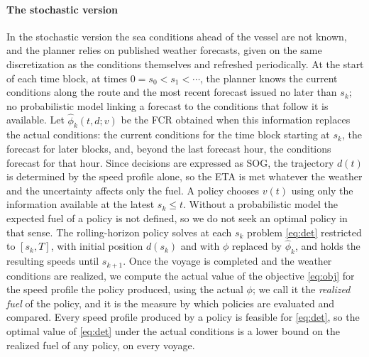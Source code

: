 \documentclass[review,authoryear]{elsarticle}
\begin{document}
\paragraph{The stochastic version}
In the stochastic version the sea conditions ahead of the vessel are not known, and the planner relies on published weather forecasts, given on the same discretization as the conditions themselves and refreshed periodically. At the start of each time block, at times $0=s_0<s_1<\cdots$, the planner knows the current conditions along the route and the most recent forecast issued no later than $s_k$; no probabilistic model linking a forecast to the conditions that follow it is available. Let $\hat\phi_k(t,d;v)$ be the FCR obtained when this information replaces the actual conditions: the current conditions for the time block starting at $s_k$, the forecast for later blocks, and, beyond the last forecast hour, the conditions forecast for that hour. Since decisions are expressed as SOG, the trajectory $d(t)$ is determined by the speed profile alone, so the ETA is met whatever the weather and the uncertainty affects only the fuel. A policy chooses $v(t)$ using only the information available at the latest $s_k\le t$. Without a probabilistic model the expected fuel of a policy is not defined, so we do not seek an optimal policy in that sense. The rolling-horizon policy solves at each $s_k$ problem \eqref{eq:det} restricted to $[s_k,T]$, with initial position $d(s_k)$ and with $\phi$ replaced by $\hat\phi_k$, and holds the resulting speeds until $s_{k+1}$. Once the voyage is completed and the weather conditions are realized, we compute the actual value of the objective \eqref{eq:obj} for the speed profile the policy produced, using the actual $\phi$; we call it the \emph{realized fuel} of the policy, and it is the measure by which policies are evaluated and compared. Every speed profile produced by a policy is feasible for \eqref{eq:det}, so the optimal value of \eqref{eq:det} under the actual conditions is a lower bound on the realized fuel of any policy, on every voyage.
\end{document}
